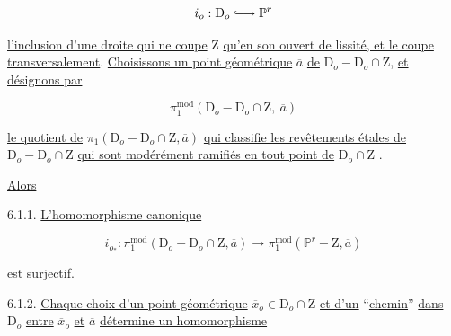 \begin{equation*}
i_o : \mathrm{D}_o \lhook\joinrel\longrightarrow \mathbb{P}^r
\end{equation*}

\underline{l'inclusion d'une droite qui ne coupe} Z \underline{qu'en son ouvert de lissité, et le coupe transversalement}. \underline{Choisissons un point géométrique} $\overline{a}$ \underline{de} $\mathrm{D}_o - \mathrm{D}_o \cap \mathrm{Z}$, \underline{et désignons par}

\begin{equation*}
\pi_1^{\mathrm{mod}}(\mathrm{D}_o - \mathrm{D}_o \cap \mathrm{Z}, \ \overline{a})
\end{equation*}

\underline{le quotient de} $\pi_1(\mathrm{D}_o - \mathrm{D}_o \cap \mathrm{Z}, \overline{a})$ \underline{qui classifie les revêtements étales de} $\mathrm{D}_o - \mathrm{D}_o \cap \mathrm{Z}$ \underline{qui sont modérément ramifiés en tout point de} $\mathrm{D}_o \cap \mathrm{Z}$ .

\underline{Alors}



%
%
6.1.1. \underline{L'homomorphisme canonique}

\begin{equation}\tag{6.1.1.1}
i_{o_*} : \pi_1^{\mathrm{mod}}(\mathrm{D}_o - \mathrm{D}_o \cap \mathrm{Z}, \overline{a}) \longrightarrow \pi_1^{\mathrm{mod}}(\mathbb{P}^r - \mathrm{Z}, \overline{a})
\end{equation}

\underline{est surjectif}.

6.1.2. \underline{Chaque choix d'un point géométrique} $\overline{x}_o \in \mathrm{D}_o \cap \mathrm{Z}$ \underline{et d'un} ``\underline{chemin}'' \underline{dans} $\mathrm{D}_o$ \underline{entre} $\overline{x}_o$ \underline{et} $\overline{a}$ \underline{détermine un homomorphisme}

